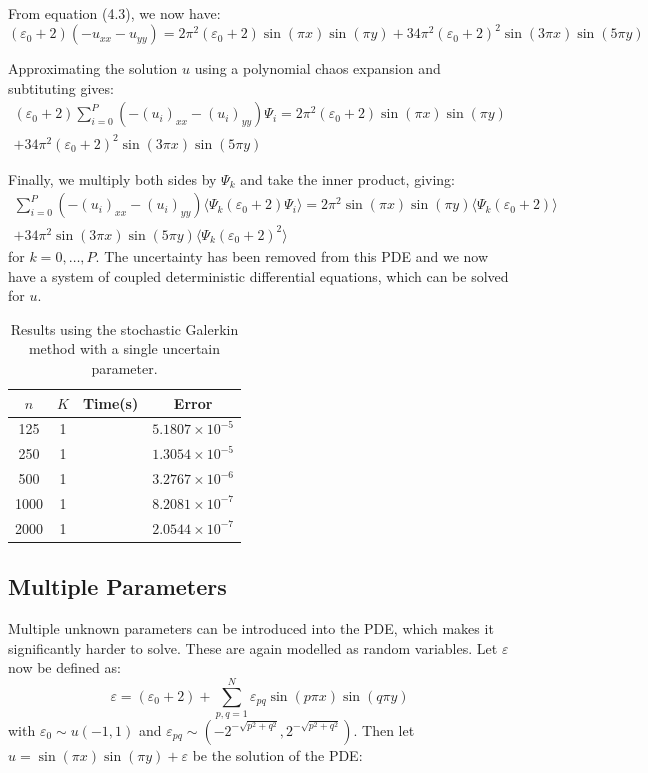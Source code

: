 \documentclass{article}
\numberwithin{equation}{section}
\begin{document}
From equation (4.3), we now have:
\begin{equation}
(\varepsilon_0+2)(- u_{xx} - u_{yy}) = 2\pi^2 (\varepsilon_0 +2) \sin(\pi x) \sin(\pi y)+ 34 \pi^2 (\varepsilon_0 + 2)^2 \sin(3 \pi x) \sin(5 \pi y) 
\end{equation}

Approximating the solution $u$ using a polynomial chaos expansion and subtituting gives:
\begin{multline}
(\varepsilon_0 + 2) \sum_{i=0}^P (-(u_i)_{xx} -(u_i)_{yy}) \Psi_i = 2\pi^2 (\varepsilon_0 + 2) \sin(\pi x) \sin(\pi y) \\
+ 34 \pi^2 (\varepsilon_0 + 2)^2 \sin(3 \pi x) \sin(5 \pi y)
\end{multline}

Finally, we multiply both sides by $\Psi_k$ and take the inner product, giving:
\begin{multline}
\sum_{i=0}^P (-(u_i)_{xx} -(u_i)_{yy}) \langle \Psi_k (\varepsilon_0 + 2) \Psi_i \rangle = 2\pi^2 \sin(\pi x) \sin(\pi y) \langle \Psi_k (\varepsilon_0 + 2) \rangle \\
+ 34 \pi^2 \sin(3 \pi x) \sin(5 \pi y) \langle \Psi_k (\varepsilon_0 + 2)^2 \rangle
\end{multline}
for $k = 0, \dots, P$. The uncertainty has been removed from this PDE and we now have a system of coupled deterministic differential equations, which can be solved for $u$.

\begin{table}[H]
\centering
\begin{tabular}{|c|c|c|c|}
\hline
$n$ & $K$ & Time(s) & Error \\
\hline
125 & 1 & & $5.1807 \times 10^{-5}$ \\
250 & 1 & & $1.3054 \times 10^{-5}$ \\
500 & 1 & & $3.2767 \times 10^{-6}$ \\
1000 & 1 & & $8.2081 \times 10^{-7}$ \\
2000 & 1 & & $2.0544 \times 10^{-7}$ \\
\hline
\end{tabular}
\captionsetup{justification=centering}
\caption{Results using the stochastic Galerkin method with a single uncertain parameter.}
\end{table}



\newpage

\subsection{Multiple Parameters}
Multiple unknown parameters can be introduced into the PDE, which makes it significantly harder to solve. These are again modelled as random variables. Let $\varepsilon$ now be defined as:
\begin{equation}
\varepsilon = (\varepsilon_0 + 2) + \sum_{p,q = 1}^N \varepsilon_{pq} \sin(p \pi x) \sin(q \pi y)
\end{equation}
with $\varepsilon_0 \sim u(-1,1)$ and $\varepsilon_{pq} \sim (-2^{-\sqrt{p^2+q^2}},2^{-\sqrt{p^2+q^2}})$. Then let $u = \sin(\pi x)\sin(\pi y) + \varepsilon$ be the solution of the PDE:
\end{document}
